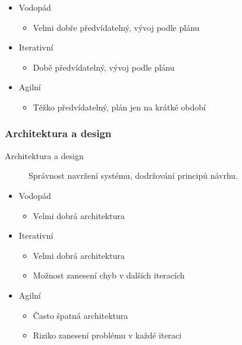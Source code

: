         \begin{itemize}
          \item Vodopád
            \begin{itemize}
              \item Velmi dobře předvídatelný, vývoj podle plánu
            \end{itemize}
          \item Iterativní
            \begin{itemize}
              \item Době předvídatelný, vývoj podle plánu
            \end{itemize}
          \item Agilní
            \begin{itemize}
              \item Těžko předvídatelný, plán jen na krátké období
            \end{itemize}
        \end{itemize}

        \subsubsection{Architektura a design}
          \begin{description}
            \item[Architektura a design] Správnost navržení systému, dodržování principů návrhu.
          \end{description}

          \begin{itemize}
            \item Vodopád
              \begin{itemize}
                \item Velmi dobrá architektura
              \end{itemize}
            \item Iterativní
              \begin{itemize}
                \item Velmi dobrá architektura
                \item Možnost zanesení chyb v dalších iteracích
              \end{itemize}
            \item Agilní
              \begin{itemize}
                \item Často špatná architektura
                \item Riziko zanesení problému v každé iteraci
              \end{itemize}
          \end{itemize}

